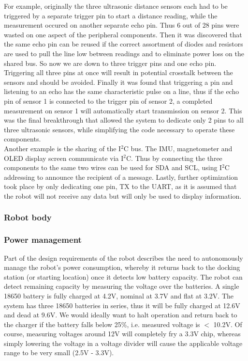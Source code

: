 For example, originally the three ultrasonic distance sensors each had to be triggered by a separate trigger pin to start a distance reading, while the measurement occured on another separate echo pin. Thus 6 out of 28 pins were wasted on one aspect of the peripheral components. Then it was discovered that the same echo pin can be reused if the correct assortment of diodes and resistors are used to pull the line low between readings and to eliminate power loss on the shared bus. So now we are down to three trigger pins and one echo pin. Triggering all three pins at once will result in potential crosstalk between the sensors and should be avoided. Finally it was found that triggering a pin and listening to an echo has the same characteristic pulse on a line, thus if the echo pin of sensor 1 is connected to the trigger pin of sensor 2, a completed measurement on sensor 1 will automatically start transmission on sensor 2. This was the final breakthrough that allowed the system to dedicate only 2 pins to all three ultrasonic sensors, while simplifying the code necessary to operate these components. \\

Another example is the sharing of the I$^2$C bus. The IMU, magnetometer and OLED display screen communicate via I$^2$C. Thus by connecting the three components to the same two wires can be used for SDA and SCL, using I$^2$C addressing to announce the recipient of a message. Lastly, further optimization took place by only dedicating one pin, TX to the UART, as it is assumed that the robot will not receive any data but will only be used to display information. \\

\subsubsection{Robot body}
\label{sec:robot} 

\subsubsection{Power management}
\label{sec:power}

Part of the design requirements of the robot describes the need to autonomously manage the robot's power consumption, whereby it returns back to the docking station (or starting location) once it detects low battery capacity. The robot can detect remaining capacity by measuring the voltage over the batteries. A single 18650 battery is fully charged at 4.2V, nominal at 3.7V and flat at 3.2V. The system has three 18650 batteries in series, thus it will be fully charged at 12.6V and dead at 9.6V. We would ideally want to halt operation and return back to the charger if the battery falls below 25\%, i.e. measured voltage is $<$ 10.2V. Of course, measuring voltages around 12V will completely fry a 3.3V chip, whereas simply lowering the voltage in a voltage divider will cause the applicable voltage range to be very small (2.5V - 3.3V). \\

